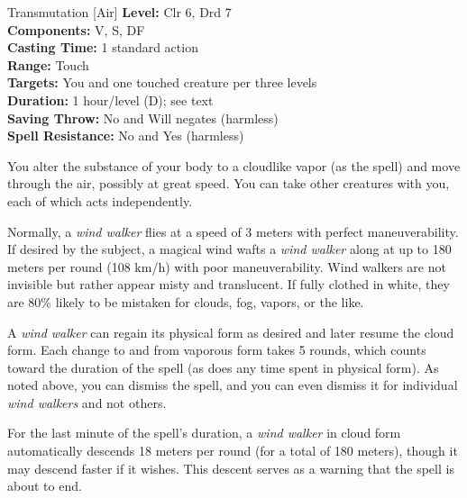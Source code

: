 {Transmutation [Air]}
{
	\textbf{Level:}
	Clr 6, Drd 7\\
	\textbf{Components:}
	V, S, DF\\
	\textbf{Casting Time:}
	1 standard action\\
	\textbf{Range:}
	Touch\\
	\textbf{Targets:}
	You and one touched creature per three levels\\
	\textbf{Duration:}
	1 hour/level (D); see text\\
	\textbf{Saving Throw:}
	No and Will negates (harmless)\\
	\textbf{Spell Resistance:}
	No and Yes (harmless)\\
}
{
	You alter the substance of your body to a cloudlike vapor (as the  spell) and move through the air, possibly at great speed. You can take other creatures with you, each of which acts independently.

	Normally, a \emph{wind walker} flies at a speed of 3 meters with perfect maneuverability. If desired by the subject, a magical wind wafts a \emph{wind walker} along at up to 180 meters per round (108 km/h) with poor maneuverability. Wind walkers are not invisible but rather appear misty and translucent. If fully clothed in white, they are 80\% likely to be mistaken for clouds, fog, vapors, or the like.

	A \emph{wind walker} can regain its physical form as desired and later resume the cloud form. Each change to and from vaporous form takes 5 rounds, which counts toward the duration of the spell (as does any time spent in physical form). As noted above, you can dismiss the spell, and you can even dismiss it for individual \emph{wind walkers} and not others.

	For the last minute of the spell's duration, a \emph{wind walker} in cloud form automatically descends 18 meters per round (for a total of 180 meters), though it may descend faster if it wishes. This descent serves as a warning that the spell is about to end.

}
